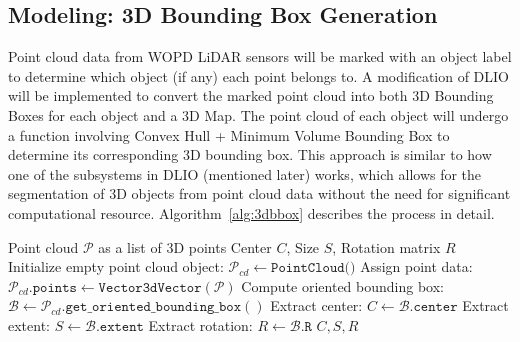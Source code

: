 \subsection{Modeling: 3D Bounding Box Generation}

Point cloud data from WOPD LiDAR sensors will be marked with an object label to determine which object (if any) each point belongs to. A modification of DLIO will be implemented to convert the marked point cloud into both 3D Bounding Boxes for each object and a 3D Map. The point cloud of each object will undergo a function involving Convex Hull + Minimum Volume Bounding Box to determine its corresponding 3D bounding box. This approach is similar to how one of the subsystems in DLIO (mentioned later) works, which allows for the segmentation of 3D objects from point cloud data without the need for significant computational resource. Algorithm~\ref{alg:3dbbox} describes the process in detail.

\begin{algorithm}[H]
  \caption{3D Bounding Box Generation}
  \label{alg:3dbbox}
  \begin{algorithmic}[1]
  \Require Point cloud $\mathcal{P}$ as a list of 3D points
  \Ensure Center $C$, Size $S$, Rotation matrix $R$
  \State Initialize empty point cloud object: $\mathcal{P}_{cd} \gets \texttt{PointCloud()}$
  \State Assign point data: $\mathcal{P}_{cd}.\texttt{points} \gets \texttt{Vector3dVector}(\mathcal{P})$
  \State Compute oriented bounding box: $\mathcal{B} \gets \mathcal{P}_{cd}.\texttt{get\_oriented\_bounding\_box}()$
  \State Extract center: $C \gets \mathcal{B}.\texttt{center}$
  \State Extract extent: $S \gets \mathcal{B}.\texttt{extent}$
  \State Extract rotation: $R \gets \mathcal{B}.\texttt{R}$
  \State \Return $C, S, R$
  \end{algorithmic}
\end{algorithm}